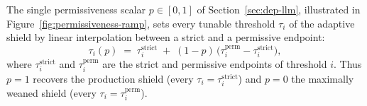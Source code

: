 The single permissiveness scalar \(p\in[0,1]\) of Section~\ref{sec:dep-llm}, illustrated in
Figure~\ref{fig:permissiveness-ramp}, sets every tunable threshold \(\tau_i\) of the adaptive
shield by linear interpolation between a strict and a permissive endpoint:
\begin{equation}\label{eq:permissiveness}
  \tau_i(p) \;=\; \tau_i^{\mathrm{strict}} \;+\; (1-p)\,\bigl(\tau_i^{\mathrm{perm}} - \tau_i^{\mathrm{strict}}\bigr),
\end{equation}
where \(\tau_i^{\mathrm{strict}}\) and \(\tau_i^{\mathrm{perm}}\) are the strict and permissive
endpoints of threshold \(i\). Thus \(p=1\) recovers the production shield (every
\(\tau_i=\tau_i^{\mathrm{strict}}\)) and \(p=0\) the maximally weaned shield (every
\(\tau_i=\tau_i^{\mathrm{perm}}\)).
